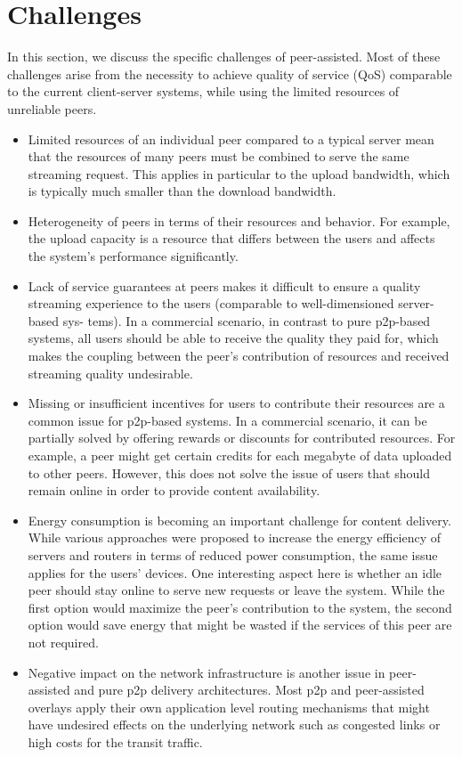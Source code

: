 \section{Challenges}
In this section, we discuss the specific challenges of peer-assisted. 
Most of these challenges arise from the necessity to achieve quality of service (QoS) comparable to the current client-server systems, while using the limited resources of unreliable peers.
\begin{itemize}
	\item {Limited resources of an individual peer compared to a typical server mean that the resources of many peers must be combined to serve the same streaming request. 
	This applies in particular to the upload bandwidth, which is typically much smaller than the download bandwidth.}
	\item {Heterogeneity of peers in terms of their resources and behavior. 
	For example, the upload capacity is a resource that differs between the users and affects the system’s performance significantly.}
	\item {Lack of service guarantees at peers makes it difficult to ensure a quality streaming experience to the users (comparable to well-dimensioned server-based sys- tems). 
	In a commercial scenario, in contrast to pure p2p-based systems, all users should be able to receive the quality they paid for, which makes the coupling between the peer’s contribution of resources and received streaming quality undesirable.}
	\item {Missing or insufficient incentives for users to contribute their resources are a common issue for p2p-based systems.
	In a commercial scenario, it can be partially solved by offering rewards or discounts for contributed resources.
	For example, a peer might get certain credits for each megabyte of data uploaded to other peers. 
	However, this does not solve the issue of users that should remain online in order to provide content availability.}
	\item {Energy consumption is becoming an important challenge for content delivery.
	While various approaches were proposed to increase the energy efficiency of servers and routers in terms of reduced power consumption, the same issue applies for the users’ devices. 
	One interesting aspect here is whether an idle peer should stay online to serve new requests or leave the system. 
	While the first option would maximize the peer’s contribution to the system, the second option would save energy that might be wasted if the services of this peer are not required.}
	\item {Negative impact on the network infrastructure is another issue in peer-assisted and pure p2p delivery architectures. 
	Most p2p and peer-assisted overlays apply their own application level routing mechanisms that might have undesired effects on the underlying network such as congested links or high costs for the transit traffic.}
\end{itemize}

